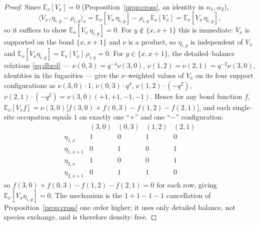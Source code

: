 \documentclass[11pt]{article}
\theoremstyle{plain}
\theoremstyle{definition}
\theoremstyle{remark}
\newcommand{\E}{\mathbb{E}}\newcommand{\PP}{\mathbb{P}}\newcommand{\dd}{\,\mathrm{d}}
\newcommand{\ip}[2]{\langle #1,#2\rangle_\nu}\newcommand{\bone}{\mathbf 1}
\begin{document}
\begin{proof}
Since $\E_\nu[V_x]=0$ (Proposition~\ref{prop:cross}, an identity in $\alpha_1,\alpha_2$),
\[
  \ip{V_x}{\eta_{i,y}-\rho_{i,y}}=\E_\nu[V_x\,\eta_{i,y}]-\rho_{i,y}\,\E_\nu[V_x]
  =\E_\nu[V_x\,\eta_{i,y}],
\]
so it suffices to show $\E_\nu[V_x\,\eta_{i,y}]=0$. For $y\notin\{x,x+1\}$ this is
immediate: $V_x$ is supported on the bond $\{x,x+1\}$ and $\nu$ is a product, so
$\eta_{i,y}$ is independent of $V_x$ and $\E_\nu[V_x\eta_{i,y}]=\E_\nu[V_x]\,\rho_{i,y}=0$.
For $y\in\{x,x+1\}$, the detailed--balance relations \eqref{eq:dbrel} ---
$\nu(0,3)=q^{-4}\nu(3,0)$, $\nu(1,2)=\nu(2,1)=q^{-2}\nu(3,0)$, identities in the
fugacities --- give the $\nu$--weighted values of $V_x$ on its four support
configurations as $\nu(3,0)\cdot1$, $\nu(0,3)\cdot q^4$, $\nu(1,2)\cdot(-q^2)$,
$\nu(2,1)\cdot(-q^2)=\nu(3,0)(+1,+1,-1,-1)$. Hence for any bond function $f$,
$\E_\nu[V_x f]=\nu(3,0)\big[f(3,0)+f(0,3)-f(1,2)-f(2,1)\big]$, and each single--site
occupation equals $1$ on exactly one ``$+$'' and one ``$-$'' configuration:
\[
  \begin{array}{c|cccc}
   & (3,0) & (0,3) & (1,2) & (2,1)\\\hline
   \eta_{1,x}   & 1 & 0 & 1 & 0\\
   \eta_{1,x+1} & 0 & 1 & 0 & 1\\
   \eta_{2,x}   & 1 & 0 & 0 & 1\\
   \eta_{2,x+1} & 0 & 1 & 1 & 0
  \end{array}
\]
so $f(3,0)+f(0,3)-f(1,2)-f(2,1)=0$ for each row, giving $\E_\nu[V_x\eta_{i,y}]=0$. The
mechanism is the $1+1-1-1$ cancellation of Proposition~\ref{prop:cross} one order
higher; it uses only detailed balance, not species exchange, and is therefore
density--free.


\end{proof}
\end{document}

